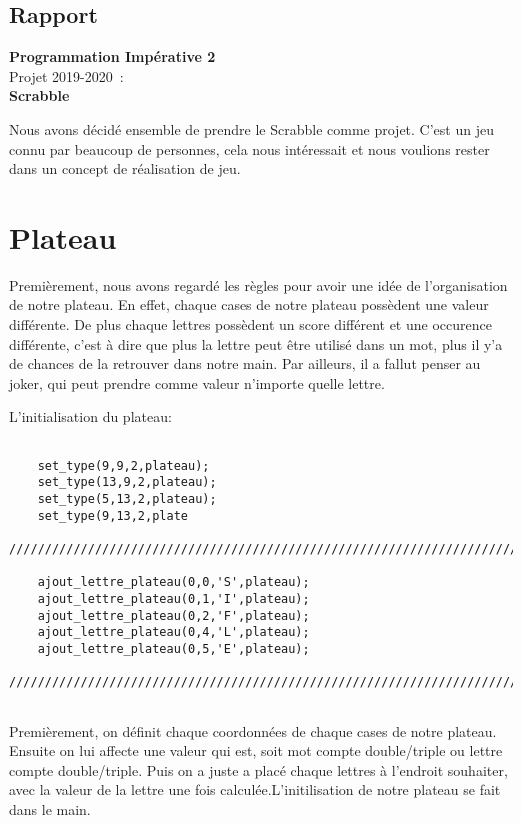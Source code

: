 \documentclass[a4paper]{article}
\begin{document}
\begin{center}\section*{Rapport}
{\Large\bf
Programmation Impérative 2\\}
Projet 2019-2020~: \\
\textbf{Scrabble}
\end{center}

Nous avons décidé ensemble de prendre le Scrabble comme projet. C'est un jeu connu par beaucoup de personnes, cela nous intéressait et nous voulions rester dans un concept de réalisation de jeu.

\section{Plateau}


Premièrement, nous avons regardé les règles pour avoir une idée de l'organisation de notre plateau. En effet, chaque cases de notre plateau possèdent une valeur différente. De plus chaque lettres possèdent un score différent et une occurence différente, c'est à dire que plus la lettre peut être utilisé dans un mot, plus il y'a de chances de la retrouver dans notre main. Par ailleurs, il a fallut penser au joker, qui peut prendre comme valeur n'importe quelle lettre.

L'initialisation du plateau:
\begin{verbatim}
  
    set_type(9,9,2,plateau);
	set_type(13,9,2,plateau);
	set_type(5,13,2,plateau);
	set_type(9,13,2,plate

//////////////////////////////////////////////////////////////////////////////////////////////////////

    ajout_lettre_plateau(0,0,'S',plateau);
	ajout_lettre_plateau(0,1,'I',plateau);
	ajout_lettre_plateau(0,2,'F',plateau);
	ajout_lettre_plateau(0,4,'L',plateau);
	ajout_lettre_plateau(0,5,'E',plateau);

//////////////////////////////////////////////////////////////////////////////////////////////////////


\end{verbatim}

Premièrement, on définit chaque coordonnées de chaque cases de notre plateau. Ensuite on lui affecte une valeur qui est, soit mot compte double/triple ou lettre compte double/triple. Puis on a juste a placé chaque lettres à l'endroit souhaiter, avec la valeur de la lettre une fois calculée.L'initilisation de notre plateau se fait dans le main.
\end{document}
